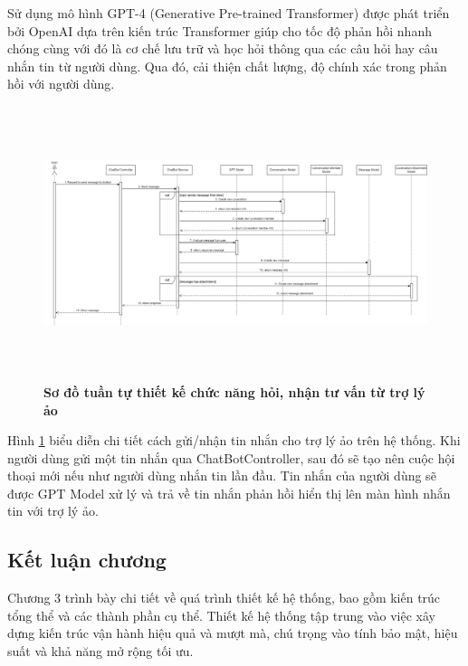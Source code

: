 Sử dụng mô hình GPT-4 (Generative Pre-trained Transformer) được phát triển bởi OpenAI dựa trên kiến trúc Transformer giúp 
cho tốc độ phản hồi nhanh chóng cùng với đó là cơ chế lưu trữ và học hỏi thông qua các câu hỏi hay câu nhắn tin từ người dùng. 
Qua đó, cải thiện chất lượng, độ chính xác trong phản hồi với người dùng.

\begin{figure}[H]
  \centering
  \includegraphics[width=16cm,height=8cm]{Images/sequence_api/sendMessageChatBot.png}
  \caption[Sơ đồ tuần tự thiết kế chức năng hỏi, nhận tư vấn từ trợ lý ảo]{\bfseries \fontsize{12pt}{0pt}
  \selectfont Sơ đồ tuần tự thiết kế chức năng hỏi, nhận tư vấn từ trợ lý ảo}
  \label{api_sendMessageChatBot} %
\end{figure}
Hình \ref{api_sendMessageChatBot} biểu diễn chi tiết cách gửi/nhận tin nhắn cho trợ lý ảo trên hệ thống. Khi người dùng gửi một tin nhắn qua ChatBotController, sau đó sẽ tạo nên cuộc hội thoại mới nếu như người dùng nhắn tin lần đầu. 
Tin nhắn của người dùng sẽ được GPT Model xử lý và trả về tin nhắn phản hồi hiển thị lên màn hình nhắn tin với trợ lý ảo.
\subsection{Kết luận chương}

Chương 3 trình bày chi tiết về quá trình thiết kế hệ thống, bao gồm kiến trúc tổng thể và các thành phần cụ thể. 
Thiết kế hệ thống tập trung vào việc xây dựng kiến trúc vận hành hiệu quả và mượt mà, chú trọng vào tính bảo mật, hiệu suất và khả năng mở rộng tối ưu.
\newpage